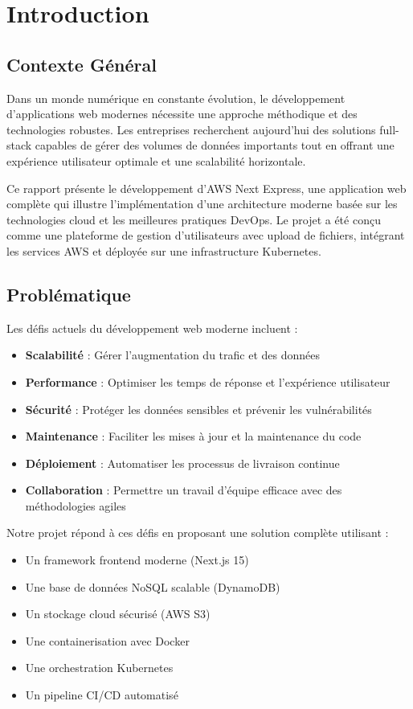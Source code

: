 \chapter{Introduction}

\section{Contexte Général}

Dans un monde numérique en constante évolution, le développement d'applications web modernes nécessite une approche méthodique et des technologies robustes. Les entreprises recherchent aujourd'hui des solutions full-stack capables de gérer des volumes de données importants tout en offrant une expérience utilisateur optimale et une scalabilité horizontale.

Ce rapport présente le développement d'AWS Next Express, une application web complète qui illustre l'implémentation d'une architecture moderne basée sur les technologies cloud et les meilleures pratiques DevOps. Le projet a été conçu comme une plateforme de gestion d'utilisateurs avec upload de fichiers, intégrant les services AWS et déployée sur une infrastructure Kubernetes.

\section{Problématique}

Les défis actuels du développement web moderne incluent :

\begin{itemize}
    \item \textbf{Scalabilité} : Gérer l'augmentation du trafic et des données
    \item \textbf{Performance} : Optimiser les temps de réponse et l'expérience utilisateur
    \item \textbf{Sécurité} : Protéger les données sensibles et prévenir les vulnérabilités
    \item \textbf{Maintenance} : Faciliter les mises à jour et la maintenance du code
    \item \textbf{Déploiement} : Automatiser les processus de livraison continue
    \item \textbf{Collaboration} : Permettre un travail d'équipe efficace avec des méthodologies agiles
\end{itemize}

Notre projet répond à ces défis en proposant une solution complète utilisant :
\begin{itemize}
    \item Un framework frontend moderne (Next.js 15)
    \item Une base de données NoSQL scalable (DynamoDB)
    \item Un stockage cloud sécurisé (AWS S3)
    \item Une containerisation avec Docker
    \item Une orchestration Kubernetes
    \item Un pipeline CI/CD automatisé
\end{itemize}

